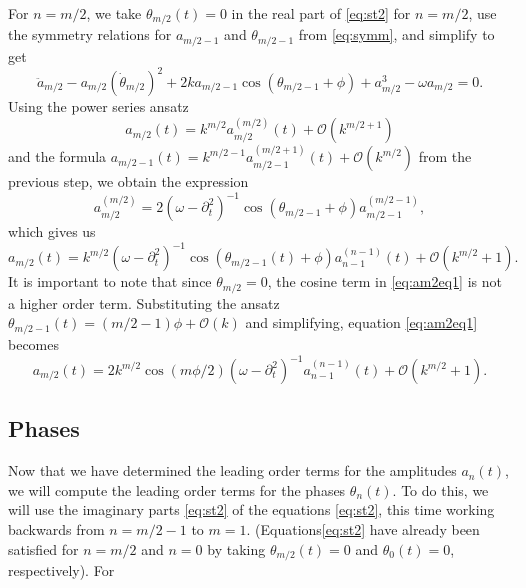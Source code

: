 \documentclass[11pt,reqno]{amsart}
\begin{document}
For $n=m/2$, we take $\theta_{m/2}(t) = 0$ in the real part of \cref{eq:st2} for $n = m/2$, use the symmetry relations for $a_{m/2-1}$ and $\theta_{m/2-1}$ from \cref{eq:symm}, and simplify to get
\[
\ddot a_{m/2} - a_{m/2} (\dot \theta_{m/2})^2 + 
2 k a_{m/2-1}\cos( \theta_{m/2-1} + \phi) + a_{m/2}^3 - \omega a_{m/2} = 0.
\]
Using the power series ansatz
\[
a_{m/2}(t) = k^{m/2} a_{m/2}^{({m/2})}(t) + \mathcal{O}(k^{m/2+1})
\]
and the formula $a_{m/2-1}(t) = k^{m/2-1}a_{m/2-1}^{(m/2+1)}(t) + \mathcal{O}(k^{m/2})$ from the previous step, we obtain the expression
\begin{equation}\label{eq:am2}
a_{m/2}^{({m/2})} = 2 (\omega - \partial_t^2)^{-1}\cos( \theta_{m/2-1} + \phi) a_{m/2-1}^{(m/2-1)},
\end{equation}
which gives us
\begin{equation}\label{eq:am2eq1}
a_{m/2}(t) = k^{m/2} (\omega - \partial_t^2)^{-1} \cos( \theta_{m/2-1}(t) + \phi)a_{n-1}^{(n-1)}(t) + \mathcal{O}(k^{m/2}+1).
\end{equation}
It is important to note that since $\theta_{m/2} = 0$, the cosine term in \cref{eq:am2eq1} is not a higher order term. Substituting the ansatz $\theta_{m/2-1}(t) = (m/2-1)\phi + \mathcal{O}(k)$ and simplifying, equation \cref{eq:am2eq1} becomes
\begin{equation}\label{eq:am2eq}
a_{m/2}(t) = 2 k^{m/2} \cos\left( m \phi / 2\right) (\omega - \partial_t^2)^{-1} a_{n-1}^{(n-1)}(t) + \mathcal{O}(k^{m/2}+1).
\end{equation}

\subsection{Phases}

Now that we have determined the leading order terms for the amplitudes $a_n(t)$, we will compute the leading order terms for the phases $\theta_n(t)$. To do this, we will use the imaginary parts \cref{eq:st2} of the equations \cref{eq:st2}, this time working backwards from $n = m/2-1$ to $m=1$. (Equations\cref{eq:st2} have already been satisfied for $n=m/2$ and $n=0$ by taking $\theta_{m/2}(t) = 0$ and $\theta_0(t) = 0$, respectively). For 
\end{document}
